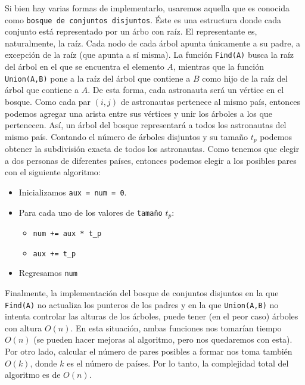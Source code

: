 \documentclass[letterpaper,11pt]{article}
\begin{document}
\begin{enumerate}
    Si bien hay varias formas de implementarlo, usaremos aquella que es conocida
    como \texttt{bosque de conjuntos disjuntos}. Éste es una estructura donde 
    cada conjunto está representado por un árbo con raíz. El representante es, 
    naturalmente, la raíz. Cada nodo de cada árbol apunta únicamente a su padre, 
    a excepción de la raíz (que apunta a sí misma). La función \texttt{Find(A)}
    busca la raíz del árbol en el que se encuentra el elemento $A$, mientras que 
    la función \texttt{Union(A,B)} pone a la raíz del árbol que contiene a $B$
    como hijo de la raíz del árbol que contiene a $A$. De esta forma, cada 
    astronauta será un vértice en el bosque. Como cada par $(i,j)$ de 
    astronautas pertenece al mismo país, entonces podemos agregar una arista 
    entre sus vértices y unir los árboles a los que pertenecen. Así, un árbol 
    del bosque representará a todos los astronautas del mismo país. Contando el 
    número de árboles disjuntos y su tamaño $t_p$ podemos obtener la subdivisión 
    exacta de todos los astronautas. Como tenemos que elegir a dos personas de 
    diferentes países, entonces podemos elegir a los posibles pares con el 
    siguiente algoritmo:
    \begin{itemize}
        \item Inicializamos \texttt{aux = num = 0}.
        \item Para cada uno de los valores de \texttt{tamaño} $t_p$:
        \begin{itemize}
            \item \texttt{num += aux * t\_p}
            \item \texttt{aux += t\_p}
        \end{itemize}

        \item Regresamos \texttt{num}
    \end{itemize}

    Finalmente, la implementación del bosque de conjuntos disjuntos en la que 
    \texttt{Find(A)} no actualiza los punteros de los padres y en la que 
    \texttt{Union(A,B)} no intenta controlar las alturas de los árboles, puede 
    tener (en el peor caso) árboles con altura $O(n)$. En esta situación, 
    ambas funciones nos tomarían tiempo $O(n)$ (se pueden hacer mejoras al 
    algoritmo, pero nos quedaremos con esta). Por otro lado, calcular el
    número de pares posibles a formar nos toma también $O(k)$, donde $k$ es el 
    número de países. Por lo tanto, la complejidad total del algoritmo es de
    $O(n)$.


\end{enumerate}
\end{document}
